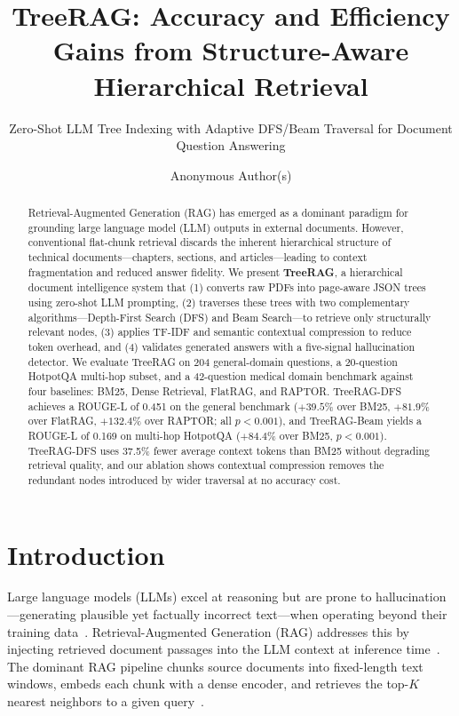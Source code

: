 \documentclass[sigconf,review,anonymous]{acmart}
\begin{document}
\title{TreeRAG: Accuracy and Efficiency Gains from Structure-Aware
Hierarchical Retrieval}
\subtitle{Zero-Shot LLM Tree Indexing with Adaptive DFS/Beam Traversal
for Document Question Answering}

\author{Anonymous Author(s)}

\begin{abstract}
Retrieval-Augmented Generation (RAG) has emerged as a dominant paradigm for
grounding large language model (LLM) outputs in external documents. However,
conventional flat-chunk retrieval discards the inherent hierarchical structure
of technical documents---chapters, sections, and articles---leading to context
fragmentation and reduced answer fidelity. We present \textbf{TreeRAG}, a
hierarchical document intelligence system that (1) converts raw PDFs into
page-aware JSON trees using zero-shot LLM prompting, (2) traverses these trees
with two complementary algorithms---Depth-First Search (DFS) and Beam
Search---to retrieve only structurally relevant nodes, (3) applies TF-IDF and
semantic contextual compression to reduce token overhead, and (4) validates
generated answers with a five-signal hallucination detector. We evaluate
TreeRAG on 204 general-domain questions, a 20-question HotpotQA multi-hop
subset, and a 42-question medical domain benchmark against four baselines:
BM25, Dense Retrieval, FlatRAG, and RAPTOR. TreeRAG-DFS achieves a ROUGE-L of
0.451 on the general benchmark ($+39.5\%$ over BM25, $+81.9\%$ over FlatRAG,
$+132.4\%$ over RAPTOR; all $p<0.001$), and TreeRAG-Beam yields a ROUGE-L of
0.169 on multi-hop HotpotQA ($+84.4\%$ over BM25, $p<0.001$). TreeRAG-DFS uses
37.5\% fewer average context tokens than BM25 without degrading retrieval
quality, and our ablation shows contextual compression removes the redundant
nodes introduced by wider traversal at no accuracy cost.
\end{abstract}


\maketitle

\section{Introduction}
Large language models (LLMs) excel at reasoning but are prone to
hallucination---generating plausible yet factually incorrect text---when
operating beyond their training data~\cite{huang2025survey}. Retrieval-Augmented
Generation (RAG) addresses this by injecting retrieved document passages into
the LLM context at inference time~\cite{lewis2020rag}. The dominant RAG pipeline
chunks source documents into fixed-length text windows, embeds each chunk with a
dense encoder, and retrieves the top-$K$ nearest neighbors to a given
query~\cite{gao2024survey}.
\end{document}
